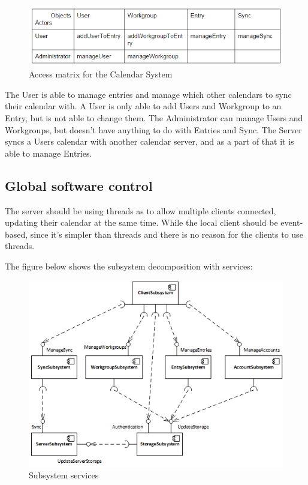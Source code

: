 \begin{figure}[h]
\centering
\includegraphics[scale = 0.8]{accessControl}
\caption{Access matrix for the Calendar System}
\end{figure}
The User is able to manage entries and manage which other calendars to sync their calendar with. A User is only able to add Users and Workgroup to an Entry, but is not able to change them.
The Administrator can manage Users and Workgroups, but doesn’t have anything to do with Entries and Sync.
The Server syncs a Users calendar with another calendar server, and as a part of that it is able to manage Entries.

\subsection{Global software control}
The server should be using threads as to allow multiple clients connected, updating their calendar at the same time. While the local client should be event-based, since it’s simpler than threads and there is no reason for the clients to use threads.

The figure below shows the subsystem decomposition with services:

\begin{figure}[h]
\centering
\includegraphics[scale = 0.7]{services}
\caption{Subsystem services}
\end{figure}

